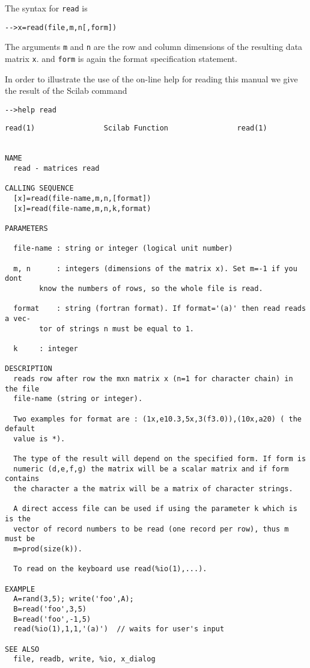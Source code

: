 	The syntax for {\tt read} is
\begin{verbatim}
-->x=read(file,m,n[,form])
\end{verbatim}
The arguments {\tt m} and {\tt n}
are the row and column dimensions of the resulting data matrix {\tt x}.
and {\tt form} is again the format specification statement.

In order to illustrate the use of the on-line help for reading this manual
we give the result of the Scilab command 
\begin{verbatim}
-->help read
\end{verbatim}

\begin{verbatim}
read(1)			       Scilab Function			      read(1)


NAME
  read - matrices read

CALLING	SEQUENCE
  [x]=read(file-name,m,n,[format])
  [x]=read(file-name,m,n,k,format)

PARAMETERS

  file-name : string or	integer	(logical unit number)

  m, n	    : integers (dimensions of the matrix x). Set m=-1 if you dont
	    know the numbers of	rows, so the whole file	is read.

  format    : string (fortran format). If format='(a)' then read reads a vec-
	    tor	of strings n must be equal to 1.

  k	    : integer

DESCRIPTION
  reads	row after row the mxn matrix x (n=1 for	character chain) in the	file
  file-name (string or integer).

  Two examples for format are :	(1x,e10.3,5x,3(f3.0)),(10x,a20)	( the default
  value	is *).

  The type of the result will depend on	the specified form. If form is
  numeric (d,e,f,g) the	matrix will be a scalar	matrix and if form contains
  the character	a the matrix will be a matrix of character strings.

  A direct access file can be used if using the	parameter k which is is	the
  vector of record numbers to be read (one record per row), thus m must	be
  m=prod(size(k)).

  To read on the keyboard use read(%io(1),...).

EXAMPLE
  A=rand(3,5); write('foo',A);
  B=read('foo',3,5)
  B=read('foo',-1,5)
  read(%io(1),1,1,'(a)')  // waits for user's input

SEE ALSO
  file,	readb, write, %io, x_dialog
\end{verbatim}

